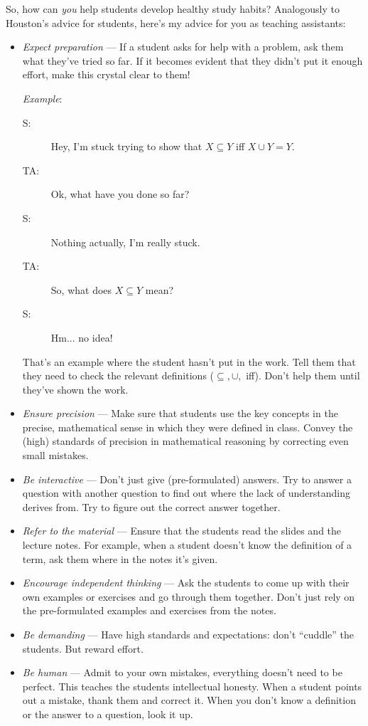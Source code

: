 So, how can \emph{you} help students develop healthy study habits?
Analogously to Houston's advice for students, here's my advice for you as teaching assistants:
\begin{itemize}

  \item \emph{Expect preparation} --- If a student asks for help with a problem, ask them what they've tried so far.
	If it becomes evident that they didn't put it enough effort, make this crystal clear to them!

	\emph{Example}:

	\begin{description}
	  \item[S:] Hey, I'm stuck trying to show that $X\subseteq Y$ iff $X\cup Y=Y$.
	  \item[TA:] Ok, what have you done so far?
	  \item[S:] Nothing actually, I'm really stuck.
	  \item[TA:] So, what does $X\subseteq Y$ mean?
	  \item[S:] Hm... no idea!
	\end{description}

	That's an example where the student hasn't put in the work.
	Tell them that they need to check the relevant definitions ($\subseteq, \cup,$ iff).
	Don't help them until they've shown the work.

	\item \emph{Ensure precision} --- Make sure that students use the key concepts in the precise, mathematical sense in which they were defined in class. Convey the (high) standards of precision in mathematical reasoning by correcting even small mistakes.
	
	\item \emph{Be interactive} --- Don't just give (pre-formulated) answers. Try to answer a question with another question to find out where the lack of understanding derives from. Try to figure out the correct answer together.
	
	\item \emph{Refer to the material} --- Ensure that the students read the slides and the lecture notes. For example, when a student doesn't know the definition of a term, ask them where in the notes it's given.
		 
	 \item \emph{Encourage independent thinking} --- Ask the students to come up with their own examples or exercises and go through them together. Don't just rely on the pre-formulated examples and exercises from the notes.
	
	\item \emph{Be demanding} --- Have high standards and expectations: don't ``cuddle'' the students. But reward effort. 
	
	\item \emph{Be human} --- Admit to your own mistakes, everything doesn't need to be perfect. This teaches the students intellectual honesty. When a student points out a mistake, thank them and correct it. When you don't know a definition or the answer to a question, look it up.

\end{itemize}

